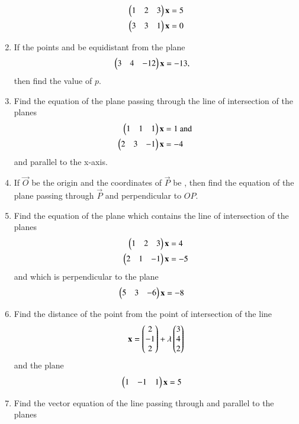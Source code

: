 \begin{enumerate}[label=\arabic*.,ref=\thesubsection.\theenumi]
\begin{align}
\begin{pmatrix}1 & 2 & 3\end{pmatrix}\mathbf{x}&=5
\\
\begin{pmatrix}3 & 3 & 1\end{pmatrix}\mathbf{x}&=0
\end{align}
\item If the points  and  be equidistant from the plane 
\begin{align}
\begin{pmatrix}3 & 4 & -12\end{pmatrix}\mathbf{x}&=-13,
\end{align}
%
then find the value of $p$.
\item Find the equation of the plane passing through the line of intersection of the planes 
\begin{align}
\begin{pmatrix}1 & 1 & 1\end{pmatrix}\mathbf{x}&=1 \text{ and }
\\
\begin{pmatrix}2 & 3 & -1\end{pmatrix}\mathbf{x}&=-4
\end{align}
%
and parallel to the x-axis.
\item If $\vec{O}$ be the origin and the coordinates of $\vec{P}$ be , then find the equation of the plane passing through $\vec{P}$ and perpendicular to $OP$.
%
\item Find the equation of the plane which contains the line of intersection of the planes 
%
\begin{align}
\begin{pmatrix}1 & 2 & 3\end{pmatrix}\mathbf{x}&=4 
\\
\begin{pmatrix}2 & 1 & -1\end{pmatrix}\mathbf{x}&=-5
\end{align}
%
and which is perpendicular to the plane 
\begin{align}
\begin{pmatrix}5 & 3 & -6\end{pmatrix}\mathbf{x}&=-8
\end{align}
%
\item Find the distance of the point  from the point of intersection of the line
%
\begin{align}
\mathbf{x} = \begin{pmatrix}2 \\ -1 \\ 2\end{pmatrix} + \lambda \begin{pmatrix}3 \\ 4 \\ 2\end{pmatrix}  
\end{align}
%
and the plane
%
\begin{align}
\begin{pmatrix}1 & -1 & 1\end{pmatrix}\mathbf{x}&=5
\end{align}
%
\item Find the vector equation of the line passing through  and parallel to the planes 

\end{enumerate}

